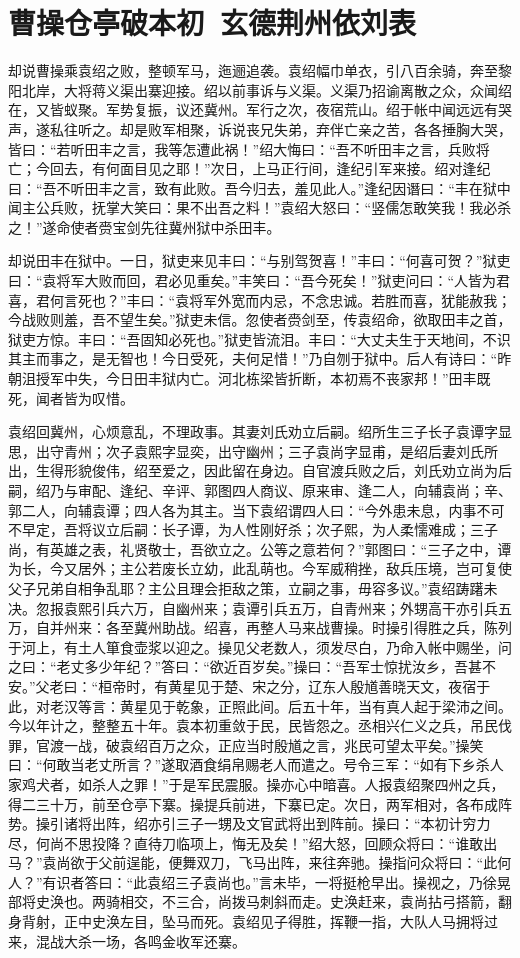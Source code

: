 \chapter{曹操仓亭破本初~玄德荆州依刘表}

却说曹操乘袁绍之败，整顿军马，迤逦追袭。袁绍幅巾单衣，引八百余骑，奔至黎阳北岸，大将蒋义渠出寨迎接。绍以前事诉与义渠。义渠乃招谕离散之众，众闻绍在，又皆蚁聚。军势复振，议还冀州。军行之次，夜宿荒山。绍于帐中闻远远有哭声，遂私往听之。却是败军相聚，诉说丧兄失弟，弃伴亡亲之苦，各各捶胸大哭，皆曰：“若听田丰之言，我等怎遭此祸！”绍大悔曰：“吾不听田丰之言，兵败将亡；今回去，有何面目见之耶！”次日，上马正行间，逢纪引军来接。绍对逢纪曰：“吾不听田丰之言，致有此败。吾今归去，羞见此人。”逢纪因谮曰：“丰在狱中闻主公兵败，抚掌大笑曰：果不出吾之料！”袁绍大怒曰：“竖儒怎敢笑我！我必杀之！”遂命使者赍宝剑先往冀州狱中杀田丰。

却说田丰在狱中。一日，狱吏来见丰曰：“与别驾贺喜！”丰曰：“何喜可贺？”狱吏曰：“袁将军大败而回，君必见重矣。”丰笑曰：“吾今死矣！”狱吏问曰：“人皆为君喜，君何言死也？”丰曰：“袁将军外宽而内忌，不念忠诚。若胜而喜，犹能赦我；今战败则羞，吾不望生矣。”狱吏未信。忽使者赍剑至，传袁绍命，欲取田丰之首，狱吏方惊。丰曰：“吾固知必死也。”狱吏皆流泪。丰曰：“大丈夫生于天地间，不识其主而事之，是无智也！今日受死，夫何足惜！”乃自刎于狱中。后人有诗曰：“昨朝沮授军中失，今日田丰狱内亡。河北栋梁皆折断，本初焉不丧家邦！”田丰既死，闻者皆为叹惜。

袁绍回冀州，心烦意乱，不理政事。其妻刘氏劝立后嗣。绍所生三子长子袁谭字显思，出守青州；次子袁熙字显奕，出守幽州；三子袁尚字显甫，是绍后妻刘氏所出，生得形貌俊伟，绍至爱之，因此留在身边。自官渡兵败之后，刘氏劝立尚为后嗣，绍乃与审配、逢纪、辛评、郭图四人商议、原来审、逢二人，向辅袁尚；辛、郭二人，向辅袁谭；四人各为其主。当下袁绍谓四人曰：“今外患未息，内事不可不早定，吾将议立后嗣：长子谭，为人性刚好杀；次子熙，为人柔懦难成；三子尚，有英雄之表，礼贤敬士，吾欲立之。公等之意若何？”郭图曰：“三子之中，谭为长，今又居外；主公若废长立幼，此乱萌也。今军威稍挫，敌兵压境，岂可复使父子兄弟自相争乱耶？主公且理会拒敌之策，立嗣之事，毋容多议。”袁绍踌躇未决。忽报袁熙引兵六万，自幽州来；袁谭引兵五万，自青州来；外甥高干亦引兵五万，自并州来：各至冀州助战。绍喜，再整人马来战曹操。时操引得胜之兵，陈列于河上，有土人箪食壶浆以迎之。操见父老数人，须发尽白，乃命入帐中赐坐，问之曰：“老丈多少年纪？”答曰：“欲近百岁矣。”操曰：“吾军士惊扰汝乡，吾甚不安。”父老曰：“桓帝时，有黄星见于楚、宋之分，辽东人殷馗善晓天文，夜宿于此，对老汉等言：黄星见于乾象，正照此间。后五十年，当有真人起于梁沛之间。今以年计之，整整五十年。袁本初重敛于民，民皆怨之。丞相兴仁义之兵，吊民伐罪，官渡一战，破袁绍百万之众，正应当时殷馗之言，兆民可望太平矣。”操笑曰：“何敢当老丈所言？”遂取酒食绢帛赐老人而遣之。号令三军：“如有下乡杀人家鸡犬者，如杀人之罪！”于是军民震服。操亦心中暗喜。人报袁绍聚四州之兵，得二三十万，前至仓亭下寨。操提兵前进，下寨已定。次日，两军相对，各布成阵势。操引诸将出阵，绍亦引三子一甥及文官武将出到阵前。操曰：“本初计穷力尽，何尚不思投降？直待刀临项上，悔无及矣！”绍大怒，回顾众将曰：“谁敢出马？”袁尚欲于父前逞能，便舞双刀，飞马出阵，来往奔驰。操指问众将曰：“此何人？”有识者答曰：“此袁绍三子袁尚也。”言未毕，一将挺枪早出。操视之，乃徐晃部将史涣也。两骑相交，不三合，尚拨马刺斜而走。史涣赶来，袁尚拈弓搭箭，翻身背射，正中史涣左目，坠马而死。袁绍见子得胜，挥鞭一指，大队人马拥将过来，混战大杀一场，各鸣金收军还寨。

